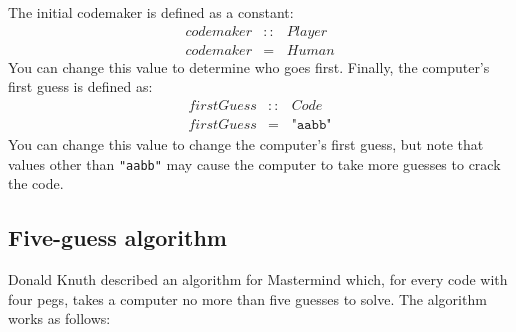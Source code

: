 \documentclass{cs256-shared/cs256}
\begin{document}
The initial codemaker is defined as a constant:
\begin{displaymath}
\begin{array}{lcl}
\mathit{codemaker} & :: & \mathit{Player} \\
\mathit{codemaker} & = & \mathit{Human}
\end{array}
\end{displaymath}
You can change this value to determine who goes first. Finally, the computer's first guess is defined as:
\begin{displaymath}
\begin{array}{lcl}
\mathit{firstGuess} & :: & \mathit{Code} \\
\mathit{firstGuess} & = & \texttt{"aabb"}
\end{array}
\end{displaymath}
You can change this value to change the computer's first guess, but note that values other than \texttt{"aabb"} may cause the computer to take more guesses to crack the code.


\subsection*{Five-guess algorithm}

Donald Knuth described an algorithm for Mastermind which, for every code with four pegs, takes a computer no more than five guesses to solve. The algorithm works as follows:
\end{document}
